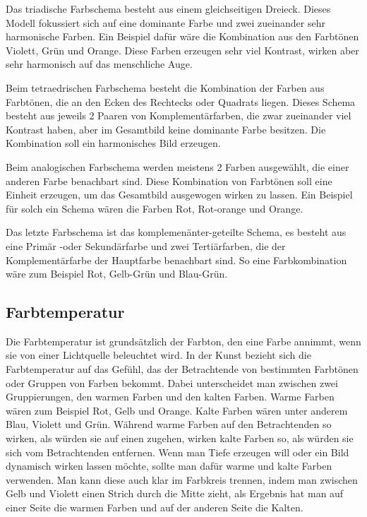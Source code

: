 Das triadische Farbschema besteht aus einem gleichseitigen Dreieck. Dieses Modell fokussiert sich auf eine dominante Farbe und zwei zueinander sehr harmonische Farben. Ein Beispiel dafür wäre die Kombination aus den Farbtönen Violett, Grün und Orange. Diese Farben erzeugen sehr viel Kontrast, wirken aber sehr harmonisch auf das menschliche Auge. 
\cite{_special_subjects}

Beim tetraedrischen Farbschema besteht die Kombination der Farben aus Farbtönen, die an den Ecken des Rechtecks oder Quadrats liegen. Dieses Schema besteht aus jeweils 2 Paaren von Komplementärfarben, die zwar zueinander viel Kontrast haben, aber im Gesamtbild keine dominante Farbe besitzen. Die Kombination soll ein harmonisches Bild erzeugen.
\cite{_special_subjects}

Beim analogischen Farbschema werden meistens 2 Farben ausgewählt, die einer anderen Farbe benachbart sind. Diese Kombination von Farbtönen soll eine Einheit erzeugen, um das Gesamtbild ausgewogen wirken zu lassen. Ein Beispiel für solch ein Schema wären die Farben Rot, Rot-orange und Orange.
\cite{_special_subjects}

Das letzte Farbschema ist das komplemenänter-geteilte Schema, es besteht aus eine Primär -oder Sekundärfarbe und zwei Tertiärfarben, die der Komplementärfarbe der Hauptfarbe benachbart sind. So eine Farbkombination wäre zum Beispiel Rot, Gelb-Grün und Blau-Grün.
\cite{_special_subjects}

\subsection{Farbtemperatur}
Die Farbtemperatur ist grundsätzlich der Farbton, den eine Farbe annimmt, wenn sie von einer Lichtquelle beleuchtet wird. In der Kunst bezieht sich die Farbtemperatur auf das Gefühl, das der Betrachtende von bestimmten Farbtönen oder Gruppen von Farben bekommt. Dabei unterscheidet man zwischen zwei Gruppierungen, den warmen Farben und den kalten Farben. Warme Farben wären zum Beispiel Rot, Gelb und Orange. Kalte Farben wären unter anderem Blau, Violett und Grün. Während warme Farben auf den Betrachtenden so wirken, als würden sie auf einen zugehen, wirken kalte Farben so, als würden sie sich vom Betrachtenden entfernen. Wenn man Tiefe erzeugen will oder ein Bild dynamisch wirken lassen möchte, sollte man dafür warme und kalte Farben verwenden. Man kann diese auch klar im Farbkreis trennen, indem man zwischen Gelb und Violett einen Strich durch die Mitte zieht, als Ergebnis hat man auf einer Seite die warmen Farben und auf der anderen Seite die Kalten.
\cite{_special_subjects}

